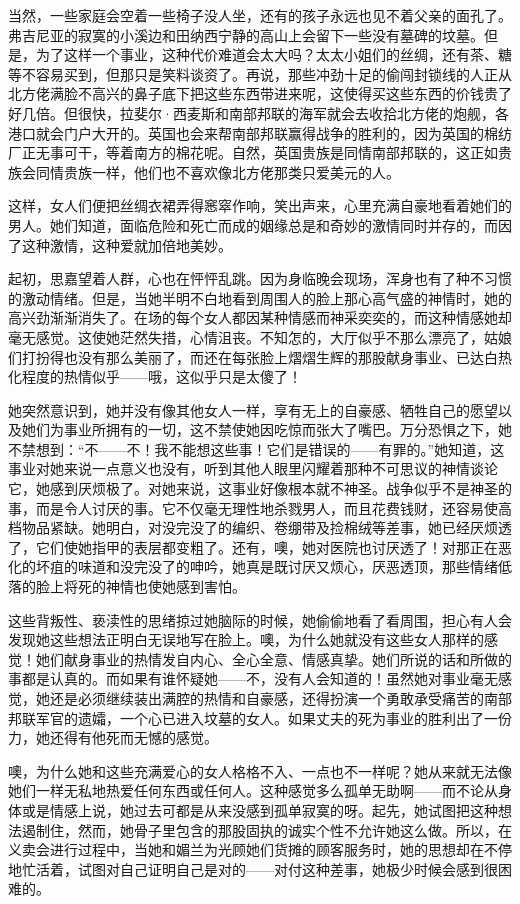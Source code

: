 \par 当然，一些家庭会空着一些椅子没人坐，还有的孩子永远也见不着父亲的面孔了。弗吉尼亚的寂寞的小溪边和田纳西宁静的高山上会留下一些没有墓碑的坟墓。但是，为了这样一个事业，这种代价难道会太大吗？太太小姐们的丝绸，还有茶、糖等不容易买到，但那只是笑料谈资了。再说，那些冲劲十足的偷闯封锁线的人正从北方佬满脸不高兴的鼻子底下把这些东西带进来呢，这使得买这些东西的价钱贵了好几倍。但很快，拉斐尔·西麦斯和南部邦联的海军就会去收拾北方佬的炮舰，各港口就会门户大开的。英国也会来帮南部邦联赢得战争的胜利的，因为英国的棉纺厂正无事可干，等着南方的棉花呢。自然，英国贵族是同情南部邦联的，这正如贵族会同情贵族一样，他们也不喜欢像北方佬那类只爱美元的人。
\par 这样，女人们便把丝绸衣裙弄得窸窣作响，笑出声来，心里充满自豪地看着她们的男人。她们知道，面临危险和死亡而成的姻缘总是和奇妙的激情同时并存的，而因了这种激情，这种爱就加倍地美妙。
\par 起初，思嘉望着人群，心也在怦怦乱跳。因为身临晚会现场，浑身也有了种不习惯的激动情绪。但是，当她半明不白地看到周围人的脸上那心高气盛的神情时，她的高兴劲渐渐消失了。在场的每个女人都因某种情感而神采奕奕的，而这种情感她却毫无感觉。这使她茫然失措，心情沮丧。不知怎的，大厅似乎不那么漂亮了，姑娘们打扮得也没有那么美丽了，而还在每张脸上熠熠生辉的那股献身事业、已达白热化程度的热情似乎——哦，这似乎只是太傻了！
\par 她突然意识到，她并没有像其他女人一样，享有无上的自豪感、牺牲自己的愿望以及她们为事业所拥有的一切，这不禁使她因吃惊而张大了嘴巴。万分恐惧之下，她不禁想到：“不——不！我不能想这些事！它们是错误的——有罪的。”她知道，这事业对她来说一点意义也没有，听到其他人眼里闪耀着那种不可思议的神情谈论它，她感到厌烦极了。对她来说，这事业好像根本就不神圣。战争似乎不是神圣的事，而是令人讨厌的事。它不仅毫无理性地杀戮男人，而且花费钱财，还容易使高档物品紧缺。她明白，对没完没了的编织、卷绷带及捡棉绒等差事，她已经厌烦透了，它们使她指甲的表层都变粗了。还有，噢，她对医院也讨厌透了！对那正在恶化的坏疽的味道和没完没了的呻吟，她真是既讨厌又烦心，厌恶透顶，那些情绪低落的脸上将死的神情也使她感到害怕。
\par 这些背叛性、亵渎性的思绪掠过她脑际的时候，她偷偷地看了看周围，担心有人会发现她这些想法正明白无误地写在脸上。噢，为什么她就没有这些女人那样的感觉！她们献身事业的热情发自内心、全心全意、情感真挚。她们所说的话和所做的事都是认真的。而如果有谁怀疑她——不，没有人会知道的！虽然她对事业毫无感觉，她还是必须继续装出满腔的热情和自豪感，还得扮演一个勇敢承受痛苦的南部邦联军官的遗孀，一个心已进入坟墓的女人。如果丈夫的死为事业的胜利出了一份力，她还得有他死而无憾的感觉。
\par 噢，为什么她和这些充满爱心的女人格格不入、一点也不一样呢？她从来就无法像她们一样无私地热爱任何东西或任何人。这种感觉多么孤单无助啊——而不论从身体或是情感上说，她过去可都是从来没感到孤单寂寞的呀。起先，她试图把这种想法遏制住，然而，她骨子里包含的那股固执的诚实个性不允许她这么做。所以，在义卖会进行过程中，当她和媚兰为光顾她们货摊的顾客服务时，她的思想却在不停地忙活着，试图对自己证明自己是对的——对付这种差事，她极少时候会感到很困难的。

